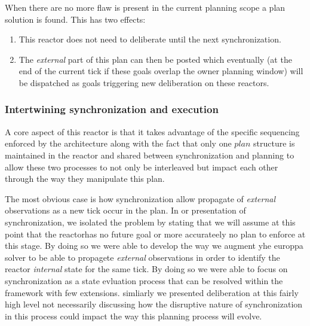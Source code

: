When there are no more flaw is present in the current planning scope a
plan solution is found. This has two effects:

\begin{enumerate}

\item This reactor does not need to deliberate until the next synchronization.

\item The {\em external} part of this plan can then be posted which
  eventually (at the end of the current tick if these goals overlap
  the owner planning window) will be dispatched as goals triggering
  new deliberation on these reactors.

\end{enumerate}

\subsubsection{Intertwining synchronization and execution}
\label{sec:arch:intertwine}

A core aspect of this reactor is that it takes advantage of the
specific sequencing enforced by the \rx architecture along with the
fact that only one $plan$ structure is maintained in the reactor and
shared between synchronization and planning to allow these two
processes to not only be interleaved but impact each other through the
way they manipulate this plan.

The most obvious case is how synchronization allow propagate of {\em
  external} observations as a new tick occur in the plan. In or
presentation of synchronization, we isolated the problem by stating
that we will assume at this point that the reactorhas no future goal
or more accurateely no plan to enforce at this stage. By doing so we
were able to develop the way we augment yhe europpa solver to be able
to propagete {\em external} observations in order to identify the
reactor {\em internal} state for the same tick. By doing so we were
able to focus on synchronization as a state evluation process that can
be resolved within the \eu framework with few extensions. simliarly
we presented deliberation at this fairly high level not necessarily
discussing how the disruptive nature of synchronization in this
process could impact the way this planning process will evolve.

